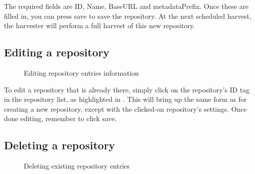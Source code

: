 \documentclass[a4paper,11pt]{article}
\begin{document}
The required fields are ID, Name, BaseURL and metadataPrefix. Once these are filled in, you can press save to save the repository. At the next scheduled harvest, the harvester will perform a full harvest of this new repository.

\subsection{Editing a repository}
\label{sec:using_the_control_panel:editing_a_repository}

\begin{figure}[h]
 \centering
 \caption{Editing repository entries information}
 \label{editing_repository_information}
\end{figure}

To edit a repository that is already there, simply click on the repository's ID tag in the repository list, as highlighted in .
This will bring up the same form as for creating a new repository, except with the clicked-on repository's settings. Once done editing, remember to click save.

\subsection{Deleting a repository}
\label{sec:using_the_control_panel:deleting_a_repository}

\begin{figure}[h]
 \centering
 \caption{Deleting existing repository entries}
 \label{deleting_repository_entry}
\end{figure}
\end{document}
